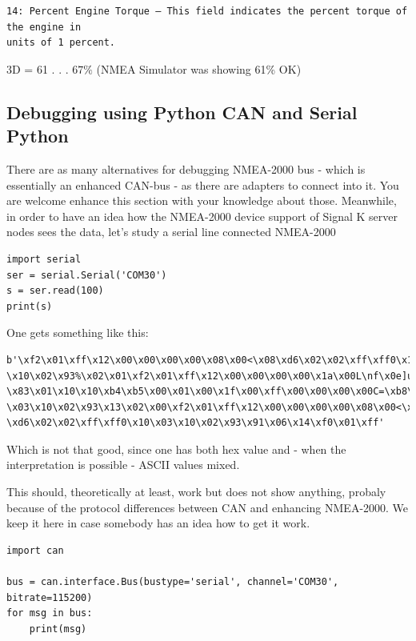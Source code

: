 \documentclass[11pt]{article}
\begin{document}
    \begin{verbatim}
14: Percent Engine Torque – This field indicates the percent torque of the engine in
units of 1 percent. 
\end{verbatim}

3D = 61 . . . \(67\%\) (NMEA Simulator was showing 61\% OK)

    \hypertarget{debugging-using-python-can-and-serial-python}{%
\subsection{Debugging using Python CAN and Serial
Python}\label{debugging-using-python-can-and-serial-python}}

    There are as many alternatives for debugging NMEA-2000 bus - which is
essentially an enhanced CAN-bus - as there are adapters to connect into
it. You are welcome enhance this section with your knowledge about
those. Meanwhile, in order to have an idea how the NMEA-2000 device
support of Signal K server nodes sees the data, let's study a serial
line connected NMEA-2000

    \begin{verbatim}
import serial
ser = serial.Serial('COM30')
s = ser.read(100)
print(s)
\end{verbatim}

    One gets something like this:

\begin{verbatim}
b'\xf2\x01\xff\x12\x00\x00\x00\x00\x08\x00<\x08\xd6\x02\x02\xff\xff0\x10\x03
\x10\x02\x93%\x02\x01\xf2\x01\xff\x12\x00\x00\x00\x00\x1a\x00L\nf\x0e]u2\x05
\x83\x01\x10\x10\xb4\xb5\x00\x01\x00\x1f\x00\xff\x00\x00\x00\x00C=\xb8\x10
\x03\x10\x02\x93\x13\x02\x00\xf2\x01\xff\x12\x00\x00\x00\x00\x08\x00<\x08
\xd6\x02\x02\xff\xff0\x10\x03\x10\x02\x93\x91\x06\x14\xf0\x01\xff'
\end{verbatim}

Which is not that good, since one has both hex value and - when the
interpretation is possible - ASCII values mixed.

    This should, theoretically at least, work but does not show anything,
probaly because of the protocol differences between CAN and enhancing
NMEA-2000. We keep it here in case somebody has an idea how to get it
work.

\begin{verbatim}
import can

bus = can.interface.Bus(bustype='serial', channel='COM30', bitrate=115200)
for msg in bus:
    print(msg)
\end{verbatim}
\end{document}
